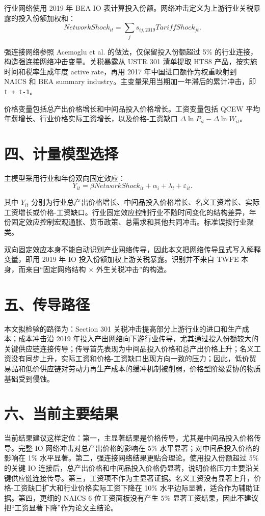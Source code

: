 \documentclass[11pt]{ctexart}
\begin{document}
行业网络使用 2019 年 BEA IO 表计算投入份额。网络冲击定义为上游行业关税暴露的投入份额加权和：
\[
NetworkShock_{it}=\sum_j s_{ij,2019}TariffShock_{jt}.
\]

强连接网络参照 Acemoglu et al. 的做法，仅保留投入份额超过 5\% 的行业连接，构造强连接网络冲击变量。关税暴露从 USTR 301 清单提取 HTS8 产品，按实施时间和税率生成年度 active rate，再用 2017 年中国进口额作为权重映射到 NAICS 和 BEA summary industry。主变量采用当期加一年滞后的累计冲击，即 \texttt{t + t-1}。

价格变量包括总产出价格增长和中间品投入价格增长。工资变量包括 QCEW 平均年薪增长、行业价格实际工资增长，以及价格-工资缺口 \(\Delta \ln P_{it}-\Delta \ln W_{it}\)。

\section*{四、计量模型选择}

主模型采用行业和年份双向固定效应：
\[
Y_{it}=\beta NetworkShock_{it}+\alpha_i+\lambda_t+\varepsilon_{it}.
\]

其中 \(Y_{it}\) 分别为行业总产出价格增长、中间品投入价格增长、名义工资增长、实际工资增长或价格-工资缺口。行业固定效应控制行业不随时间变化的结构差异，年份固定效应控制宏观通胀、货币政策、总需求和其他共同冲击。标准误按行业聚类。

双向固定效应本身不能自动识别产业网络传导，因此本文把网络传导显式写入解释变量，即用 2019 年 IO 投入份额加权上游关税暴露。识别并不来自 TWFE 本身，而来自“固定网络结构 \(\times\) 外生关税冲击”的构造。

\section*{五、传导路径}

本文拟检验的路径为：Section 301 关税冲击提高部分上游行业的进口和生产成本；成本冲击沿 2019 年投入产出网络向下游行业传导，尤其通过投入份额较大的关键供应链连接传导；传导首先表现为中间品投入价格和总产出价格上升；名义工资没有同步上升，实际工资和价格-工资缺口出现方向一致的压力；因此，低价贸易品和低价供应链对劳动力再生产成本的缓冲机制被削弱，价格型阶级妥协的物质基础受到侵蚀。

\section*{六、当前主要结果}

当前结果建议这样定位：第一，主显著结果是价格传导，尤其是中间品投入价格传导。完整 IO 网络冲击对总产出价格的影响在 5\% 水平显著；对中间品投入价格的影响在 1\% 水平显著。第二，强连接网络结果更贴合理论。使用投入份额超过 5\% 的关键 IO 连接后，总产出价格和中间品投入价格仍显著，说明价格压力主要沿关键供应链连接传导。第三，工资项不作为主显著证据。名义工资没有显著上升，价格-工资缺口扩大和行业价格实际工资下降在 10\% 水平边际显著，适合作为辅助证据。第四，更细的 NAICS 6 位工资面板没有产生 5\% 显著工资结果，因此不建议把“工资显著下降”作为论文主结论。
\end{document}
